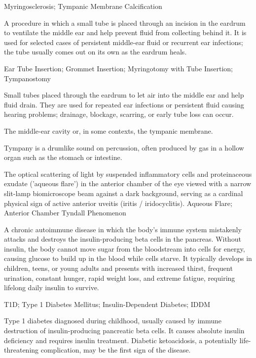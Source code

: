 \synonyms
Myringosclerosis; Tympanic Membrane Calcification

 A procedure in which a small tube is placed through an incision in the eardrum to ventilate the middle ear and help prevent fluid from collecting behind it. It is used for selected cases of persistent middle-ear fluid or recurrent ear infections; the tube usually comes out on its own as the eardrum heals.

\synonyms
Ear Tube Insertion; Grommet Insertion; Myringotomy with Tube Insertion; Tympanostomy

 Small tubes placed through the eardrum to let air into the middle ear and help fluid drain. They are used for repeated ear infections or persistent fluid causing hearing problems; drainage, blockage, scarring, or early tube loss can occur.

 The middle-ear cavity or, in some contexts, the tympanic membrane.

 Tympany is a drumlike sound on percussion, often produced by gas in a hollow organ such as the stomach or intestine.

 The optical scattering of light by suspended inflammatory cells and proteinaceous exudate ('aqueous flare') in the anterior chamber of the eye viewed with a narrow slit-lamp biomicroscope beam against a dark background, serving as a cardinal physical sign of active anterior uveitis (iritis / iridocyclitis).
\synonyms
Aqueous Flare; Anterior Chamber Tyndall Phenomenon

 A chronic autoimmune disease in which the body's immune system mistakenly attacks and destroys the insulin-producing beta cells in the pancreas. Without insulin, the body cannot move sugar from the bloodstream into cells for energy, causing glucose to build up in the blood while cells starve. It typically develops in children, teens, or young adults and presents with increased thirst, frequent urination, constant hunger, rapid weight loss, and extreme fatigue, requiring lifelong daily insulin to survive.


\synonyms
T1D; Type 1 Diabetes Mellitus; Insulin-Dependent Diabetes; IDDM

 Type 1 diabetes diagnosed during childhood, usually caused by
immune destruction of insulin-producing pancreatic beta cells. It causes absolute insulin deficiency and
requires insulin treatment. Diabetic ketoacidosis, a potentially life-threatening complication, may be
the first sign of the disease.

